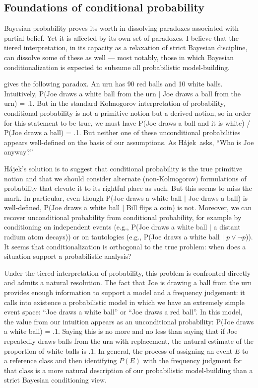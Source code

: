 \documentclass[letterpaper,12pt]{article}
\newcommand{\hajek}{H\'ajek}
\begin{document}
\subsection{Foundations of conditional probability}
\label{sec:conditionalFoundations}
Bayesian probability proves its worth in dissolving paradoxes associated with partial belief. Yet it is affected by its own set of paradoxes. I believe that the tiered interpretation, in its capacity as a relaxation of strict Bayesian discipline, can dissolve some of these as well --- most notably, those in which Bayesian conditionalization is expected to subsume all probabilistic model-building.

\cite{DBLP:journals/synthese/Hajek07} gives the following paradox. An urn has 90 red balls and 10 white balls. Intuitively, P(Joe draws a white ball from the urn $\mid$ Joe draws a ball from the urn) = .1. But in the standard Kolmogorov interpretation of probability, conditional probability is not a primitive notion but a derived notion, so in order for this statement to be true, we must have P(Joe draws a ball and it is white) / P(Joe draws a ball) = .1. But neither one of these unconditional probabilities appears well-defined on the basis of our assumptions. As \hajek\ asks, ``Who is Joe anyway?''

\hajek's solution is to suggest that conditional probability is the true primitive notion and that we should consider alternate (non-Kolmogorov) formulations of probability that elevate it to its rightful place as such. But this seems to miss the mark. In particular, even though P(Joe draws a white ball $\mid$ Joe draws a ball) is well-defined, P(Joe draws a white ball $\mid$ Bill flips a coin) is not. Moreover, we can recover unconditional probability from conditional probability, for example by conditioning on independent events (e.g., P(Joe draws a white ball $\mid$ a distant radium atom decays)) or on tautologies (e.g., P(Joe draws a white ball $\mid$ $p \lor \neg p$)). It seems that conditionalization is orthogonal to the true problem: when does a situation support a probabilistic analysis?

Under the tiered interpretation of probability, this problem is confronted directly and admits a natural resolution. The fact that Joe is drawing a ball from the urn provides enough information to support a model and a frequency judgement: it calls into existence a probabilistic model in which we have an extremely simple event space: ``Joe draws a white ball'' or ``Joe draws a red ball''. In this model, the value from our intuition appears as an unconditional probability: P(Joe draws a white ball) = .1. Saying this is no more and no less than saying that if Joe repeatedly draws balls from the urn with replacement, the natural estimate of the proportion of white balls is $.1$. In general, the process of assigning an event $E$ to a reference class and then identifying $P(E)$ with the frequency judgment for that class is a more natural description of our probabilistic model-building than a strict Bayesian conditioning view.
\end{document}
